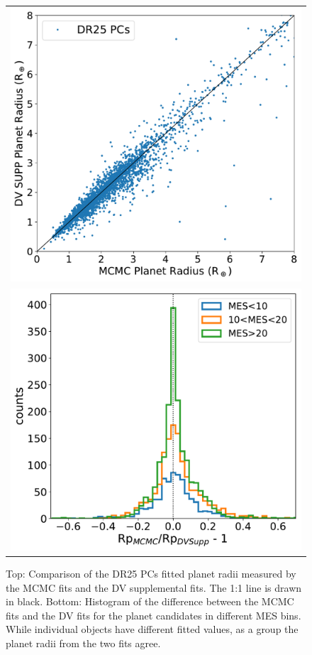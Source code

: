 \begin{figure}[htb]
\centering
\begin{tabular}{c}
\includegraphics[width=\linewidth]{f3-top.pdf} \\[2em]
\includegraphics[width=\linewidth]{f3-bottom.pdf}
\end{tabular}
\caption{Top: Comparison of the DR25 PCs fitted planet radii measured by the MCMC fits and the DV supplemental fits. The 1:1 line is drawn in black. Bottom: Histogram of the difference between the MCMC fits and the DV fits for the planet candidates in different MES bins. While individual objects have different fitted values, as a group the planet radii from the two fits agree. }
\label{f:mcmcsupp}
\end{figure}


